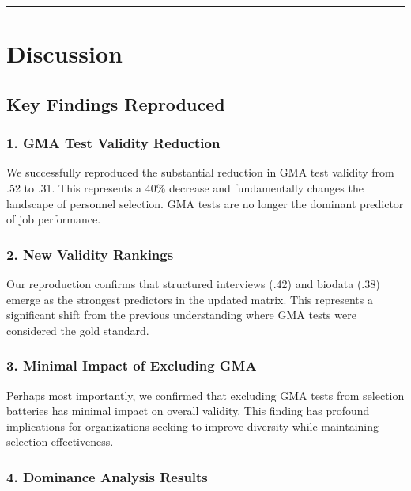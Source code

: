 \documentclass[
]{article}
\begin{document}
\begin{center}\rule{0.5\linewidth}{0.5pt}\end{center}

\section{Discussion}\label{discussion}

\subsection{Key Findings Reproduced}\label{key-findings-reproduced}

\subsubsection{1. GMA Test Validity
Reduction}\label{gma-test-validity-reduction}

We successfully reproduced the substantial reduction in GMA test
validity from .52 to .31. This represents a 40\% decrease and
fundamentally changes the landscape of personnel selection. GMA tests
are no longer the dominant predictor of job performance.

\subsubsection{2. New Validity Rankings}\label{new-validity-rankings}

Our reproduction confirms that structured interviews (.42) and biodata
(.38) emerge as the strongest predictors in the updated matrix. This
represents a significant shift from the previous understanding where GMA
tests were considered the gold standard.

\subsubsection{3. Minimal Impact of Excluding
GMA}\label{minimal-impact-of-excluding-gma}

Perhaps most importantly, we confirmed that excluding GMA tests from
selection batteries has minimal impact on overall validity. This finding
has profound implications for organizations seeking to improve diversity
while maintaining selection effectiveness.

\subsubsection{4. Dominance Analysis
Results}\label{dominance-analysis-results-1}
\end{document}
